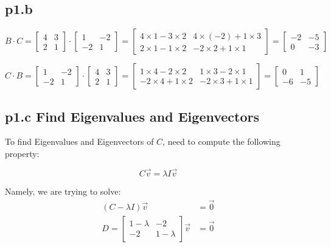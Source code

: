 \documentclass[11pt]{article}
\begin{document}
\subsection{p1.b}

\[
B \cdot C = \begin{bmatrix}
    4 & 3 \\
    2 & 1
\end{bmatrix}
\cdot
\begin{bmatrix}
    1 & -2 \\
    -2 & 1
\end{bmatrix}
= \begin{bmatrix}
    4 \times 1 - 3 \times 2 & 4 \times (-2) + 1 \times 3 \\    
    2 \times 1 - 1 \times 2 & -2 \times 2 + 1 \times 1 
\end{bmatrix}
 = \begin{bmatrix}
   -2 & -5 \\ 
   0 & -3
 \end{bmatrix}
\]

\[
C \cdot B = 
\begin{bmatrix}
    1 & -2 \\
    -2 & 1
\end{bmatrix} \cdot 
\begin{bmatrix}
    4 & 3 \\    
    2 & 1
\end{bmatrix} = 
\begin{bmatrix}
1 \times 4 - 2 \times 2 & 1 \times 3 - 2 \times 1 \\
-2 \times 4 + 1 \times 2 & -2 \times 3 + 1 \times 1  

\end{bmatrix} = 
\begin{bmatrix}
   0 & 1 \\ 
   -6 & -5
\end{bmatrix}
\]



\subsection{p1.c Find Eigenvalues and Eigenvectors}

To find Eigenvalues and Eigenvectors of \(C\), need to compute the following property: 

\[
C \vec{v} = \lambda I \vec{v}
\]


Namely, we are trying to solve:
\begin{equation}
\begin{split}
(C - \lambda I) \vec{v} &= \vec{0} \\ 
D = \begin{bmatrix}
    1 - \lambda & -2 \\
    -2 & 1 - \lambda
\end{bmatrix} \vec{v} &= \vec{0}
\end{split}
\end{equation}
\end{document}
